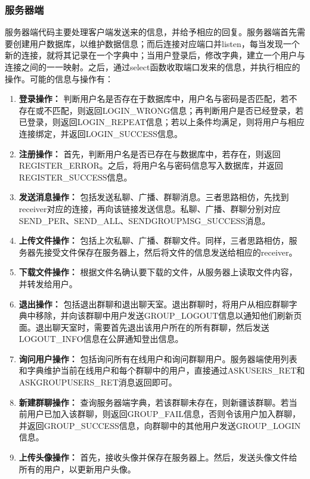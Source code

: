\documentclass[12pt]{article} %
\begin{document}
\begin{sloppypar}
\subsubsection{服务器端}

服务器端代码主要处理客户端发送来的信息，并给予相应的回复。服务器端首先需要创建用户数据库，以维护数据信息；而后连接对应端口并listen，每当发现一个新的连接，就将其记录在一个字典中；当用户登录后，修改字典，建立一个用户与连接之间的一一映射。之后，通过select函数收取端口发来的信息，并执行相应的操作。可能的信息与操作有：
\begin{enumerate}
	\item {\bf 登录操作：} 判断用户名是否存在于数据库中，用户名与密码是否匹配，若不存在或不匹配，则返回LOGIN\_WRONG信息；再判断用户是否已经登录，若已登录，则返回LOGIN\_REPEAT信息；若以上条件均满足，则将用户与相应连接绑定，并返回LOGIN\_SUCCESS信息。
	\item {\bf 注册操作：} 首先，判断用户名是否已存在与数据库中，若存在，则返回REGISTER\_ERROR。之后，将用户名与密码信息写入数据库，并返回REGISTER\_SUCCESS信息。
	\item {\bf 发送消息操作：} 包括发送私聊、广播、群聊消息。三者思路相仿，先找到receiver对应的连接，再向该链接发送信息。私聊、广播、群聊分别对应SEND\_PER、SEND\_ALL、SENDGROUPMSG\_SUCCESS消息。
	\item {\bf 上传文件操作：} 包括上次私聊、广播、群聊文件。同样，三者思路相仿，服务器先接受文件保存在服务器上，然后将文件的信息发送给相应的receiver。
	\item {\bf 下载文件操作：} 根据文件名确认要下载的文件，从服务器上读取文件内容，并转发给用户。
	\item {\bf 退出操作：} 包括退出群聊和退出聊天室。退出群聊时，将用户从相应群聊字典中移除，并向该群聊中用户发送GROUP\_LOGOUT信息以通知他们刷新页面。退出聊天室时，需要首先退出该用户所在的所有群聊，然后发送LOGOUT\_INFO信息在公屏通知登出信息。
	\item {\bf 询问用户操作：} 包括询问所有在线用户和询问群聊用户。服务器端使用列表和字典维护当前在线用户和每个群聊中的用户，直接通过ASKUSERS\_RET和ASKGROUPUSERS\_RET消息返回即可。
	\item {\bf 新建群聊操作：} 查询服务器端字典，若该群聊未存在，则新疆该群聊。若当前用户已加入该群聊，则返回GROUP\_FAIL信息，否则令该用户加入群聊，并返回GROUP\_SUCCESS信息，向群聊中的其他用户发送GROUP\_LOGIN信息。
	\item {\bf 上传头像操作：} 首先，接收头像并保存在服务器上。然后，发送头像文件给所有的用户，以更新用户头像。
\end{enumerate}


\end{sloppypar}
\end{document}
